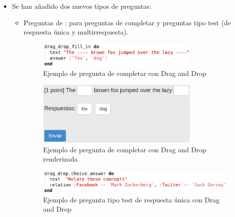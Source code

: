 \begin{itemize}
\begin{itemize}
  \end{itemize}
  \newpage
  
  \item Se han a\~{n}adido dos nuevos tipos de preguntas:
  \begin{itemize}
    \item Preguntas de : para preguntas de completar y preguntas tipo test (de respuesta \'unica
    y multirrespuesta).
    \begin{figure}[!th]
    \begin{center}
    \includegraphics[width=0.8\textwidth]{images/dd1.eps}
    \caption{Ejemplo de pregunta de completar con Drag and Drop}
    \label{fig:dd1}
    \end{center}
    \end{figure}
    
    \begin{figure}[!th]
    \begin{center}
    \includegraphics[width=0.8\textwidth]{images/dd1r.eps}
    \caption{Ejemplo de pregunta de completar con Drag and Drop renderizada}
    \label{fig:dd1r}
    \end{center}
    \end{figure}
    \newpage
    
    \begin{figure}[!th]
    \begin{center}
    \includegraphics[width=1\textwidth]{images/dd2.eps}
    \caption{Ejemplo de pregunta tipo test de respuesta \'unica con Drag and Drop}
    \label{fig:dd2}
    \end{center}
    \end{figure}
    

\end{itemize}
\end{itemize}
